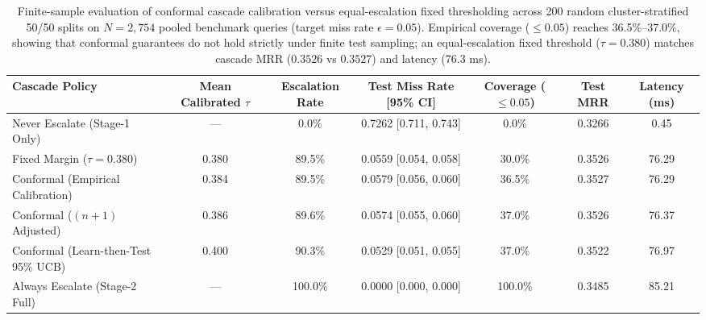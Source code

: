 \begin{table}[htbp]
\centering
\small
\caption{Finite-sample evaluation of conformal cascade calibration versus equal-escalation fixed thresholding across 200 random cluster-stratified 50/50 splits on $N=2{,}754$ pooled benchmark queries (target miss rate $\epsilon = 0.05$). Empirical coverage ($\le 0.05$) reaches 36.5\%--37.0\%, showing that conformal guarantees do not hold strictly under finite test sampling; an equal-escalation fixed threshold ($\tau=0.380$) matches cascade MRR ($0.3526$ vs $0.3527$) and latency ($76.3$ ms).}
\label{tab:conformal_cascade_v3}
\begin{tabular}{lcccccc}
\toprule
Cascade Policy & Mean Calibrated $\tau$ & Escalation Rate & Test Miss Rate [95\% CI] & Coverage ($\le 0.05$) & Test MRR & Latency (ms) \\
\midrule
Never Escalate (Stage-1 Only)     & ---   & 0.0\%  & 0.7262 [0.711, 0.743] & 0.0\%  & 0.3266 & 0.45 \\
Fixed Margin ($\tau = 0.380$)     & 0.380 & 89.5\% & 0.0559 [0.054, 0.058] & 30.0\% & 0.3526 & 76.29 \\
Conformal (Empirical Calibration) & 0.384 & 89.5\% & 0.0579 [0.056, 0.060] & 36.5\% & 0.3527 & 76.29 \\
Conformal ($(n+1)$ Adjusted)      & 0.386 & 89.6\% & 0.0574 [0.055, 0.060] & 37.0\% & 0.3526 & 76.37 \\
Conformal (Learn-then-Test 95\% UCB) & 0.400 & 90.3\% & 0.0529 [0.051, 0.055] & 37.0\% & 0.3522 & 76.97 \\
Always Escalate (Stage-2 Full)    & ---   & 100.0\%& 0.0000 [0.000, 0.000] & 100.0\%& 0.3485 & 85.21 \\
\bottomrule
\end{tabular}
\end{table}
